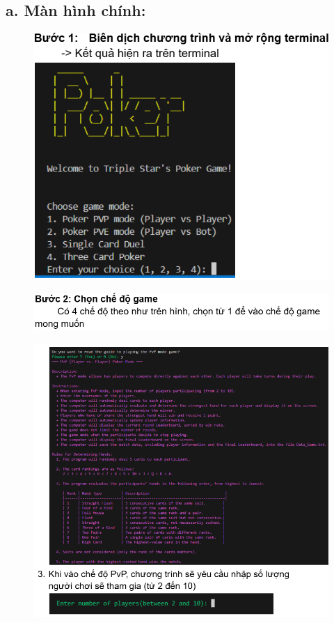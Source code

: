 \documentclass{article}
\begin{document}
\subsection{a. Màn hình chính:}
    \begin{figure}[h!]
        \centering
        \includegraphics[width=1\textwidth]{images/screenshot/4_a_1.png}
    \end{figure}
    \begin{figure}
        \centering
        \includegraphics[width=1\textwidth]{images/screenshot/4_a_2.png}
    \end{figure}
    \begin{figure}
        \centering
        \includegraphics[width=1\textwidth]{images/screenshot/4_a_3.png}
    \end{figure}
\end{document}
